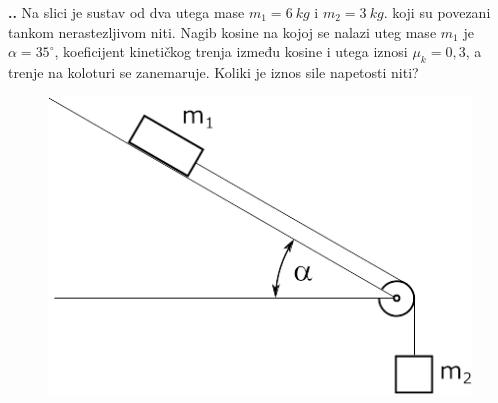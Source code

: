 

\noindent 
\textbf{
\thecjelina.\thezadatak.}
Na slici  je sustav od dva utega mase $m_1=6\ kg$ i $m_2=3\ kg$. koji su povezani tankom nerastezljivom niti. Nagib kosine na kojoj se nalazi uteg mase $m_1$ je $\alpha=35^\circ$, koeficijent kinetičkog trenja između kosine i utega iznosi $\mu_k=0,3$, a trenje na koloturi se zanemaruje. Koliki je iznos sile napetosti niti?
\begin{figure}[ht]%
  \begin{center}
    \includegraphics[scale=0.30]{../03_Dinamika_materijalne_tocke/Zadatak_D702.png}
  \end{center}
\end{figure}

